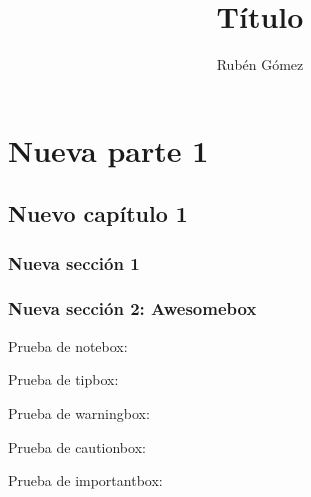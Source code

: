 \documentclass{yukibook}
\title{Título}
\author{Rubén Gómez}
\begin{document}
\maketitle
\tableofcontents

\part{Nueva parte 1}

\chapter{Nuevo capítulo 1}
\section{Nueva sección 1}
\Blindtext[2]


\section{Nueva sección 2: Awesomebox}
Prueba de notebox:
\notebox{\Blindtext[1]}

Prueba de tipbox:
\tipbox{\Blindtext[1]}

Prueba de warningbox:
\warningbox{\Blindtext[1]}

Prueba de cautionbox:
\cautionbox{\Blindtext[1]}

Prueba de importantbox:
\importantbox{\Blindtext[1]}


\begin{info-box}
  \notebox{\Blindtext[1]}
\end{info-box}
\begin{warning-box}
  \Blindtext[1]
\end{warning-box}
\begin{error-box}
  \Blindtext[1]
\end{error-box}
\end{document}
